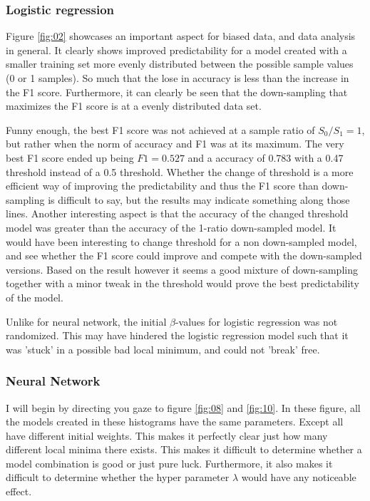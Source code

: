 \documentclass[uio,jmp,amsmath,amssymb,reprint,nofootinbib]{revtex4-1}
\numberwithin{equation}{section}
\begin{document}
\subsubsection{Logistic regression}

Figure \ref{fig:02} showcases an important aspect for biased data, and data analysis in general. It clearly shows improved predictability for a model created with a smaller training set more evenly distributed between the possible sample values (0 or 1 samples). So much that the lose in accuracy is less than the increase in the F1 score. Furthermore, it can clearly be seen that the down-sampling that maximizes the F1 score is at a evenly distributed data set.

Funny enough, the best F1 score was not achieved at a sample ratio of \(S_0/S_1=1\), but rather when the norm of accuracy and F1 was at its maximum. The very best F1 score ended up being \(F1=0.527\) and a accuracy of 0.783 with a 0.47 threshold instead of a 0.5 threshold. Whether the change of threshold is a more efficient way of improving the predictability and thus the F1 score than down-sampling is difficult to say, but the results may indicate something along those lines. Another interesting aspect is that the accuracy of the changed threshold model was greater than the accuracy of the 1-ratio down-sampled model. It would have been interesting to change threshold for a non down-sampled model, and see whether the F1 score could improve and compete with the down-sampled versions. Based on the result however it seems a good mixture of down-sampling together with a minor tweak in the threshold would prove the best predictability of the model.

Unlike for neural network, the initial \(\beta\)-values for logistic regression was not randomized. This may have hindered the logistic regression model such that it was 'stuck' in a possible bad local minimum, and could not 'break' free.

\subsubsection{Neural Network}

I will begin by directing you gaze to figure \ref{fig:08} and \ref{fig:10}. In these figure, all the models created in these histograms have the same parameters. Except all have different initial weights. This makes it perfectly clear just how many different local minima there exists. This makes it difficult to determine whether a model combination is good or just pure luck. Furthermore, it also makes it difficult to determine whether the hyper parameter \(\lambda\) would have any noticeable effect. 
\end{document}
